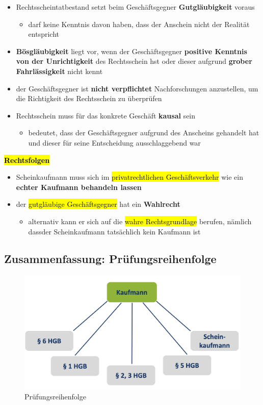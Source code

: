 \documentclass[a4paper, 10pt]{article}
\begin{document}
\begin{itemize}
    \item Rechtsscheintatbestand setzt beim Geschäftsgegner \textbf{Gutgläubigkeit} voraus
    \begin{itemize}
        \item darf keine Kenntnis davon haben, dass der Anschein nicht der Realität entspricht
    \end{itemize}

    \item \textbf{Bösgläubigkeit} liegt vor, wenn der Geschäftsgegner \textbf{positive Kenntnis von der Unrichtigkeit} des Rechtsschein hst oder dieser aufgrund \textbf{grober Fahrlässigkeit} nicht kennt 

    \item der Geschäftsgegner ist \textbf{nicht verpflichtet} Nachforschungen anzustellen, um die Richtigkeit des Rechtsschein zu überprüfen

    \item Rechtsschein muss für das konkrete Geschäft \textbf{kausal} sein
    \begin{itemize}
        \item bedeutet, dass der Geschäftsgegner aufgrund des Anscheins gehandelt hat und dieser für seine Entscheidung ausschlaggebend war
    \end{itemize}
\end{itemize}
\textbf{\hl{Rechtsfolgen}}
\begin{itemize}
    \item Scheinkaufmann muss sich im \hl{privatrechtlichen Geschäftsverkehr} wie ein \textbf{echter Kaufmann behandeln lassen}
    \item der \hl{gutgläubige Geschäftsgegner} hat ein \textbf{Wahlrecht}
    \begin{itemize}
        \item alternativ kann er sich auf die \hl{wahre Rechtsgrundlage} berufen, nämlich dassder Scheinkaufmann tatsächlich kein Kaufmann ist 
    \end{itemize}
\end{itemize}

\subsection{Zusammenfassung: Prüfungsreihenfolge}
\begin{figure}[h]
    \centering
    \includegraphics[width=0.5\linewidth]{Bildschirmfoto 2024-10-30 um 17.05.46.png}
    \caption{Prüfungsreihenfolge}
    \label{fig:enter-label}
\end{figure}
\end{document}

